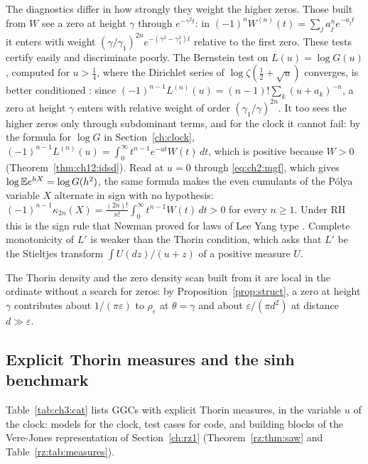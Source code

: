The diagnostics differ in how strongly they weight the higher zeros. Those built from $W$ see a zero at height $\gamma$ through $e^{-\gamma^2t}$: in $(-1)^nW^{(n)}(t)=\sum_ja_j^ne^{-a_jt}$ it enters with weight $(\gamma/\gamma_1)^{2n}e^{-(\gamma^2-\gamma_1^2)t}$ relative to the first zero. These tests certify easily and discriminate poorly. The Bernstein test on $L(u)=\log G(u)$, computed for $u>\frac14$, where the Dirichlet series of $\log\zeta(\frac12+\sqrt u)$ converges, is better conditioned \cite[Section 18.2.2]{P26}: since $(-1)^{n-1}L^{(n)}(u)=(n-1)!\sum_k(u+a_k)^{-n}$, a zero at height $\gamma$ enters with relative weight of order $(\gamma_1/\gamma)^{2n}$. It too sees the higher zeros only through subdominant terms, and for the clock it cannot fail: by the formula for $\log G$ in Section~\ref{ch:clock}, $(-1)^{n-1}L^{(n)}(u)=\int_0^\infty t^{n-1}e^{-ut}W(t)\,dt$, which is positive because $W>0$ (Theorem~\ref{thm:ch12:idsd}). Read at $u=0$ through \eqref{eq:ch2:mgf}, which gives $\log\mathbb{E} e^{hX}=\log G(h^2)$, the same formula makes the even cumulants of the P\'olya variable $X$ alternate in sign with no hypothesis: $(-1)^{n-1}\kappa_{2n}(X)=\frac{(2n)!}{n!}\int_0^\infty t^{n-1}W(t)\,dt>0$ for every $n\ge1$. Under RH this is the sign rule that Newman proved for laws of Lee Yang type \cite{Newman75}. Complete monotonicity of $L'$ is weaker than the Thorin condition, which asks that $L'$ be the Stieltjes transform $\int U(dz)/(u+z)$ of a positive measure $U$.

The Thorin density and the zero density scan built from it are local in the ordinate without a search for zeros: by Proposition~\ref{prop:struct}, a zero at height $\gamma$ contributes about $1/(\pi\varepsilon)$ to $\rho_\varepsilon$ at $\theta=\gamma$ and about $\varepsilon/(\pi d^2)$ at distance $d\gg\varepsilon$.

\subsection{Explicit Thorin measures and the sinh benchmark}\label{sec:ch3:bench}

Table~\ref{tab:ch3:cat} lists GGCs with explicit Thorin measures, in the variable $u$ of the clock: models for the clock, test cases for code, and building blocks of the Vere-Jones representation of Section~\ref{ch:rz1} (Theorem~\ref{rz:thm:saw} and Table~\ref{rz:tab:measures}).

